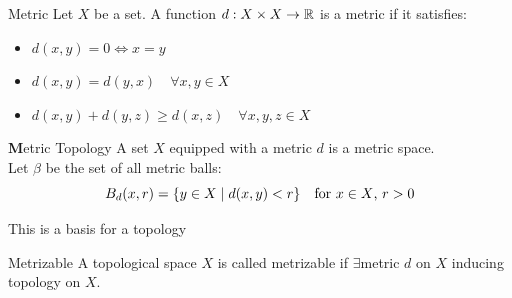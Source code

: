 \begin{definition}{Metric}{}
    Let $X$ be a set. A function $d: X \times X \to \mathbb{R}$ is a metric if it satisfies:
    \begin{itemize}
        \item $d(x,y)=0 \iff x=y$
        \item $d(x,y)=d(y,x) \quad \forall x,y \in X$
        \item $d(x,y)+d(y,z) \geq d(x,z) \quad \forall x,y,z \in X$
    \end{itemize}
\end{definition}
\begin{example}{\textbf Metric Topology}{}
    \noindent A set $X$ equipped with a metric $d$ is a metric space.\\
    Let $\beta$ be the set of all metric balls:
    \[B_d(x,r) = \{y \in X \mid d(x,y)<r\} \quad \text{for $x \in X$, $r>0$}\]
\end{example}
\begin{proposition}{}{}
    This is a basis for a topology
\end{proposition}
\begin{definition}{Metrizable}{}
    A topological space $X$ is called metrizable if $\exists$metric $d$ on $X$ inducing topology on $X$.
\end{definition}

